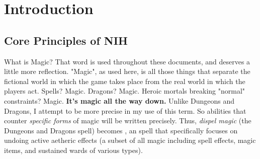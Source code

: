 \chapter{Introduction}
\section{Core Principles of NIH}

\begin{DndSidebar}[float=b]{What is Magic?}
    That word is used throughout these documents, and deserves a little more reflection. "Magic", as used here, is all those things that separate the fictional world in which the game takes place from the real world in which the players act. Spells? Magic. Dragons? Magic. Heroic mortals breaking "normal" constraints? Magic. \textbf{It's magic all the way down.} Unlike Dungeons and Dragons, I attempt to be more precise in my use of this term. So abilities that counter \textit{specific forms} of magic will be written precisely. Thus, \textit{dispel magic} (the Dungeons and Dragons spell) becomes , an spell that specifically focuses on undoing active aetheric effects (a subset of all magic including spell effects, magic items, and sustained wards of various types).
\end{DndSidebar}

